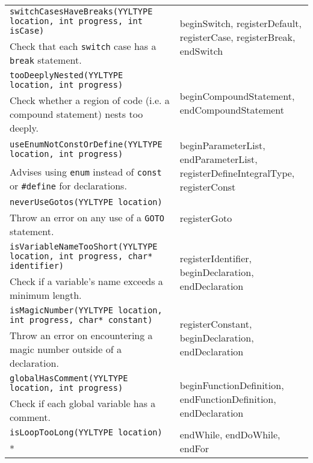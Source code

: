 \documentclass[12pt]{report}
\begin{document}
\begin{longtable}{p{10cm} p{\saxColSize}}
		\lstinline!switchCasesHaveBreaks(YYLTYPE location, int progress, int isCase)! & \multirow{2}{\saxColSize}{beginSwitch, registerDefault, registerCase, registerBreak, endSwitch} \\*
		 Check that each \lstinline!switch! case has a \lstinline!break! statement. \vspace{\vertSize} \\
		\lstinline!tooDeeplyNested(YYLTYPE location, int progress)! & \multirow{2}{\saxColSize}{beginCompoundStatement, endCompoundStatement} \\*
		 Check whether a region of code (i.e. a compound statement) nests too deeply. \vspace{\vertSize} \\
		\lstinline!useEnumNotConstOrDefine(YYLTYPE location, int progress)! & \multirow{2}{\saxColSize}{beginParameterList, endParameterList, registerDefineIntegralType, registerConst} \\*
			 Advises using \lstinline!enum! instead of \lstinline!const! or \lstinline!#define! for declarations. \vspace{\vertSize} \\
		\lstinline!neverUseGotos(YYLTYPE location)! & \multirow{2}{\saxColSize}{registerGoto} \\*
			 Throw an error on any use of a \lstinline!GOTO! statement. \vspace{\vertSize} \\
		\lstinline!isVariableNameTooShort(YYLTYPE location, int progress, char* identifier)! & \multirow{2}{\saxColSize}{registerIdentifier, beginDeclaration, endDeclaration} \\*
		 Check if a variable's name exceeds a minimum length. \vspace{\vertSize} \\
		\lstinline!isMagicNumber(YYLTYPE location, int progress, char* constant)! & \multirow{2}{\saxColSize}{registerConstant, beginDeclaration, endDeclaration} \\*
			 Throw an error on encountering a magic number outside of a declaration. \vspace{\vertSize} \\
		\lstinline!globalHasComment(YYLTYPE location, int progress)! & \multirow{2}{\saxColSize}{beginFunctionDefinition, endFunctionDefinition, endDeclaration} \\*
			 Check if each global variable has a comment. \vspace{\vertSize} \\
		\lstinline!isLoopTooLong(YYLTYPE location)! & \multirow{2}{\saxColSize}{endWhile, endDoWhile, endFor} \\ *

\end{longtable}
\end{document}
